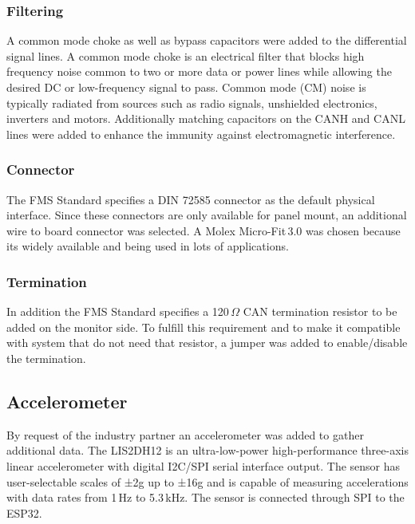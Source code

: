\subsubsection{Filtering}
A common mode choke as well as bypass capacitors were added to the differential signal lines. A common mode choke is an electrical filter that blocks high frequency noise common to two or more data or power lines while allowing the desired DC or low-frequency signal to pass. Common mode (CM) noise is typically radiated from sources such as radio signals, unshielded electronics, inverters and motors. Additionally matching capacitors on the CANH and CANL lines were added to enhance the immunity against electromagnetic interference. 

\subsubsection{Connector}
The FMS Standard specifies a DIN 72585 connector as the default physical interface. Since these connectors are only available for panel mount, an additional wire to board connector was selected. A Molex Micro-Fit\,3.0 was chosen because its widely available and being used in lots of applications.

\subsubsection{Termination}
In addition the FMS Standard specifies a 120\,$\Omega$ CAN termination resistor to be added on the monitor side. To fulfill this requirement and to make it compatible with system that do not need that resistor, a jumper was added to enable/disable the termination.   

\subsection{Accelerometer}
By request of the industry partner an accelerometer was added to gather additional data. The LIS2DH12 is an ultra-low-power high-performance three-axis linear accelerometer with digital I2C/SPI serial interface output. The sensor has user-selectable scales of ±2g up to ±16g and is capable of measuring accelerations with data rates from 1\,Hz to 5.3\,kHz. The sensor is connected through SPI to the ESP32.

\newpage
